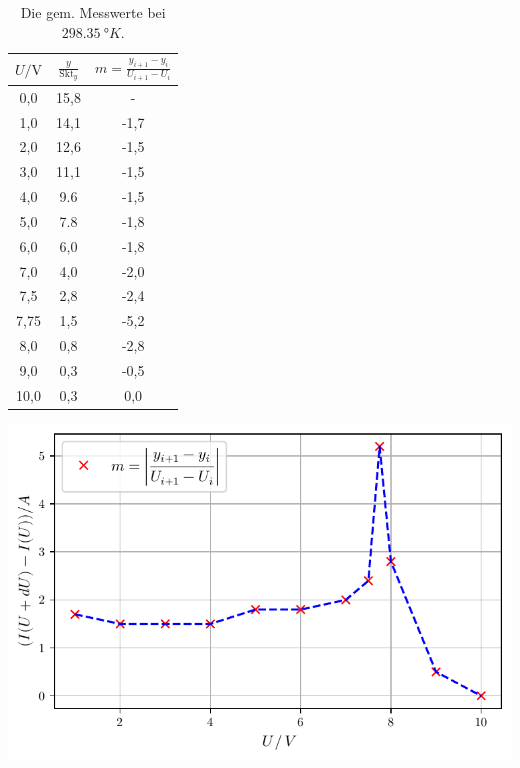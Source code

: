 \begin{table}[H]
  \begin{minipage}[b]{0.4\linewidth}
    \centering
    \begin{tabular}{c c c}
      \toprule
      $U / \unit\V$ & $\frac{y}{\text{Skt}_y}$ & $m  =\frac{y_{i+1} - y_{i}}{U_{i+1} - U_{i}}$ \\
      \midrule 
      0,0 & 15,8  &  -   \\
      1,0 & 14,1  & -1,7 \\
      2,0 & 12,6  & -1,5 \\
      3,0 & 11,1  & -1,5 \\
      4,0 &  9.6  & -1,5 \\
      5,0 &  7.8  & -1,8 \\
      6,0 &  6,0  & -1,8 \\
      7,0 &  4,0  & -2,0 \\
      7,5 &  2,8  & -2,4 \\
      7,75&  1,5  & -5,2 \\
      8,0 &  0,8  & -2,8 \\
      9,0 &  0,3  & -0,5 \\
      10,0&  0,3  &  0,0 \\
      \bottomrule
    \end{tabular}
    \caption{Die gem. Messwerte bei $\qty{298.35}{°K}$.}
    \label{tab:tabelle2}
  \end{minipage}\hfill
  \begin{minipage}[b]{0.45\linewidth}
  \centering
  \includegraphics[width=\linewidth]{build/plot1.pdf}
  \label{fig:plot1}
  \end{minipage}
\end{table}

